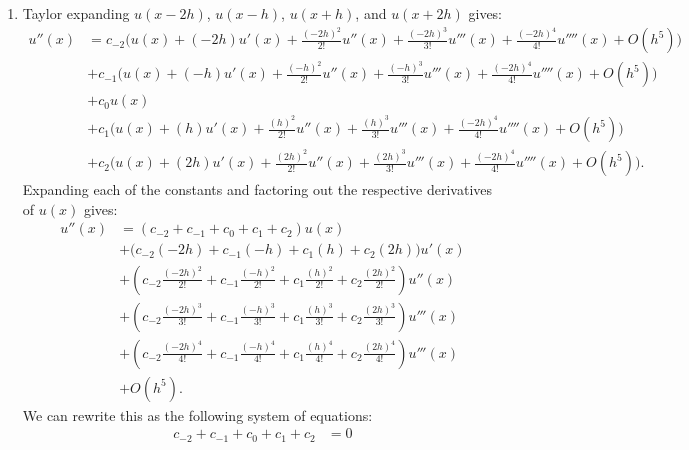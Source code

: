 \documentclass[12pt,twoside,openany]{memoir}
\begin{document}
\begin{solution}
    \phantom{a}
\begin{enumerate}[label = (\arabic*),itemsep=1pt,topsep=3pt]

\item Taylor expanding $u(x-2h)$, $u(x-h)$, $u(x+h)$, and $u(x+2h)$ gives:
    \begin{equation*}
\begin{split}
    u''(x)
    &= c_{-2} \Biggl( u(x) + (-2h)u'(x) + \frac{(-2h)^2}{2!}u''(x) + \frac{(-2h)^3}{3!}u'''(x) + \frac{(-2h)^4}{4!}u''''(x) + O(h^5) \Biggr) \\
    &+ c_{-1} \Biggl( u(x) + (-h)u'(x) + \frac{(-h)^2}{2!}u''(x) + \frac{(-h)^3}{3!}u'''(x) + \frac{(-2h)^4}{4!}u''''(x) + O(h^5) \Biggr) \\
    &+ c_{0} u(x) \\
    &+ c_{1} \Biggl( u(x) + (h)u'(x) + \frac{(h)^2}{2!}u''(x) + \frac{(h)^3}{3!}u'''(x) + \frac{(-2h)^4}{4!}u''''(x) + O(h^5) \Biggr) \\
    &+ c_{2} \Biggl( u(x) + (2h)u'(x) + \frac{(2h)^2}{2!}u''(x) + \frac{(2h)^3}{3!}u'''(x) + \frac{(-2h)^4}{4!}u''''(x) + O(h^5) \Biggr).
\end{split}
\end{equation*}
Expanding each of the constants and factoring out the respective derivatives of $u(x)$ gives:
    \begin{equation*}
    \begin{split}
        u''(x) 
        & = (c_{-2}+c_{-1}+c_{0}+c_{1}+c_{2})u(x) \\
        &+ \bigl(c_{-2}(-2h) + c_{-1}(-h) + c_{1}(h) + c_{2}(2h)\bigr)u'(x) \\
        &+ \left(c_{-2}\frac{(-2h)^2}{2!} + c_{-1}\frac{(-h)^2}{2!}  + c_{1}\frac{(h)^2}{2!} + c_{2}\frac{(2h)^2}{2!}\right)u''(x) \\
        &+ \left(c_{-2}\frac{(-2h)^3}{3!} + c_{-1}\frac{(-h)^3}{3!}  + c_{1}\frac{(h)^3}{3!} + c_{2}\frac{(2h)^3}{3!}\right)u'''(x) \\
        &+ \left(c_{-2}\frac{(-2h)^4}{4!} + c_{-1}\frac{(-h)^4}{4!}  + c_{1}\frac{(h)^4}{4!} + c_{2}\frac{(2h)^4}{4!}\right)u'''(x) \\
        &+ O(h^5).
    \end{split}
    \end{equation*}
We can rewrite this as the following system of equations:
    \begin{equation*}
    \begin{split}
        c_{-2}+c_{-1}+c_{0}+c_{1}+c_{2} &= 0 \\

\end{split}
\end{equation*}
\end{enumerate}
\end{solution}
\end{document}
